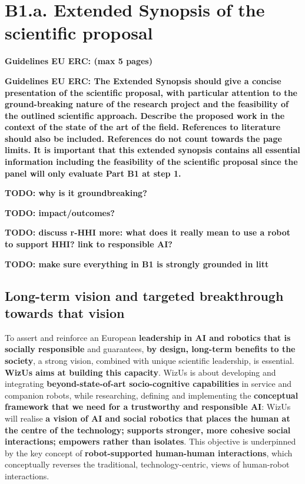 \documentclass[11pt]{report}
\newcommand{\project}{WizUs\xspace}
\newcommand{\TODO}[1]{{\color{red}\textbf{TODO: #1}}}
\newcommand{\eu}[1]{{\color{teal}\textbf{Guidelines EU ERC: #1}}}
\begin{document}
\newcommand{\wpFour}{Social situation assessment}
\newcommand{\wpFourShort}{\wpFour{}}

\newcommand{\wpFive}{Data-driven social behaviour generation}
\newcommand{\wpFiveShort}{Social behaviours}

\newcommand{\wpSix}{Experimental investigation}
\newcommand{\wpSixShort}{Experimental investigation}

\newcommand{\wpSeven}{TDB}
\newcommand{\wpSevenShort}{TBD}





\newrefsection

\chapter{B1.a. Extended Synopsis of the scientific proposal}\label{part1}
\eu{(max 5 pages)}

\eu{The Extended Synopsis should give a concise presentation of the scientific
proposal, with particular attention to the ground-breaking nature of the
research project and the feasibility of the outlined scientific approach.
Describe the proposed work in the context of the state of the art of the field.
References to literature should also be included. References do not count
towards the page limits. It is important that this extended synopsis contains
all essential information including the feasibility of the scientific proposal
since the panel will only evaluate Part B1 at step 1.}

\TODO{why is it groundbreaking?}

\TODO{impact/outcomes?}

\TODO{discuss r-HHI more: what does it really mean to use a robot to support
HHI? link to responsible AI?}

\TODO{make sure everything in B1 is strongly grounded in litt}

\section{Long-term vision and targeted breakthrough towards that vision}

To assert and reinforce an European \textbf{leadership in AI and robotics that
is socially responsible} and guarantees, \textbf{by design, long-term benefits
to the society}, a strong vision, combined with unique scientific leadership, is
essential.  \textbf{\project aims at building this capacity}. \project is about
developing and integrating \textbf{beyond-state-of-art socio-cognitive
capabilities} in service and companion robots, while researching, defining and
implementing the \textbf{conceptual framework that we need for a trustworthy and
responsible AI}: \project will realise \textbf{a vision of AI and social
robotics that places the human at the centre of the technology; supports
stronger, more cohesive social interactions; empowers rather than isolates}.
This objective is underpinned by the key concept of \textbf{robot-supported
human-human interactions}, which conceptually reverses the traditional, technology-centric,
views of human-robot interactions.
\end{document}
